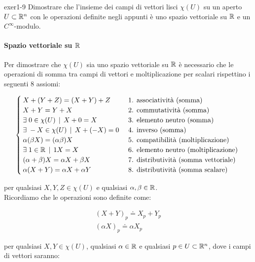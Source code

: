 {exer1-9}
{
Dimostrare che l'insieme dei campi di vettori lisci $ \chi(U) $ su un aperto $ U \subset \mathbb{R}^{n} $ con le operazioni definite negli appunti è uno spazio vettoriale su $ \mathbb{R} $ e un $ C^{\infty} $-modulo.
}
{
\paragraph{Spazio vettoriale su $ \mathbb{R} $}

Per dimostrare che $ \chi(U) $ sia uno spazio vettoriale su $ \mathbb{R} $ è necessario che le operazioni di somma tra campi di vettori e moltiplicazione per scalari rispettino i seguenti 8 assiomi:

\begin{equation}
	\begin{cases}
		X + (Y + Z) = (X + Y) + Z & \text{ 1. associatività (somma) } \\
		X + Y = Y + X & \text{ 2. commutatività (somma) } \\
		\exists \; 0 \in \chi(U) \, \mid \, X + 0 = X & \text{ 3. elemento neutro (somma) } \\
		\exists \; - X \in \chi(U) \, \mid \, X + (- X) = 0 & \text{ 4. inverso (somma) } \\
		\alpha (\beta X) = (\alpha \beta) X & \text{ 5. compatibilità (moltiplicazione) } \\
		\exists \; 1 \in \mathbb{R} \, \mid \, 1 X = X & \text{ 6. elemento neutro (moltiplicazione) } \\
		(\alpha + \beta) X = \alpha X + \beta X & \text{ 7. distributività (somma vettoriale) } \\
		\alpha (X + Y) = \alpha X + \alpha Y & \text{ 8. distributività (somma scalare) }
	\end{cases}
\end{equation}

per qualsiasi $ X, Y, Z \in \chi(U) $ e qualsiasi $ \alpha, \beta \in \mathbb{R} $. \\
Ricordiamo che le operazioni sono definite come:

\begin{gather}
	(X + Y)_{p} \doteq X_{p} + Y_{p} \\
	(\alpha X)_{p} \doteq \alpha X_{p}
\end{gather}

per qualsiasi $ X, Y \in \chi(U) $, qualsiasi $ \alpha \in \mathbb{R} $ e qualsiasi $ p \in U \subset \mathbb{R}^{n} $, dove i campi di vettori saranno:

}
